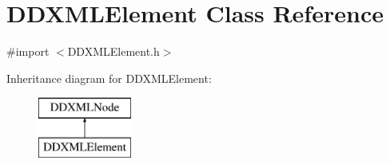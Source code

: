 \hypertarget{class_d_d_x_m_l_element}{
\section{DDXMLElement Class Reference}
\label{class_d_d_x_m_l_element}
}


{\ttfamily \#import $<$DDXMLElement.h$>$}

Inheritance diagram for DDXMLElement:\begin{figure}[H]
\begin{center}
\leavevmode
\includegraphics[height=2cm]{class_d_d_x_m_l_element}
\end{center}
\end{figure}
